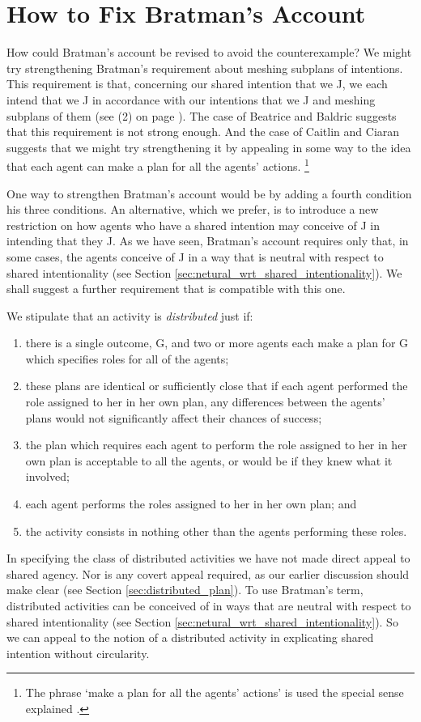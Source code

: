 \documentclass[12pt,\papersize]{extarticle}
\begin{document}
\section{How to Fix Bratman's Account}
\label{sec:fix}

How could Bratman's account be revised to avoid the counterexample?
We might try strengthening Bratman's requirement about meshing subplans of intentions.
This requirement is that, concerning our shared intention that we J, we each intend that we J in accordance with our intentions that we J and meshing subplans of them (see (2) on page \pageref{quote:bratman_account}).
The case of Beatrice and Baldric suggests that this requirement is not strong enough.
And the case of Caitlin and Ciaran suggests that we might try strengthening it by appealing in some way to the idea that each agent can make a plan for all the agents' actions.%
\footnote{
The phrase `make a plan for all the agents' actions' is used the special sense explained .
}

One way to strengthen Bratman's account would be by adding a fourth condition his three conditions.
An alternative, which we prefer, is to introduce a new restriction on how agents who have a shared intention may conceive of J in intending that they J.
As we have seen, Bratman's account requires only that, in some cases, the agents conceive of J in a way that is neutral with respect to shared intentionality (see Section \vref{sec:netural_wrt_shared_intentionality}).
We shall suggest a further requirement that is compatible with this one.

We stipulate that an activity is \emph{distributed} just if: 
%
\begin{enumerate}[label=\emph{\alph*})]
%
\item 	there is a single outcome, G,
	and two or more agents each make a plan for G which specifies  roles for all of the agents;	
%
\item 	these plans are identical or sufficiently close that if each agent performed the role assigned to her in her own plan, any differences between the agents' plans would not significantly affect their chances of success;
%
\item the plan which requires each agent to perform the role assigned to her in her own plan is acceptable to all the agents, or would be if they knew what it involved; 
\item	each agent performs the roles assigned to her in her own plan; and
%
\item	the activity consists in nothing other than the agents performing these roles.
%
\end{enumerate}
%
In specifying the class of distributed activities we have not made direct appeal to shared agency. 
Nor is any covert appeal required, as our earlier discussion should  make clear (see Section \vref{sec:distributed_plan}).
To use Bratman's term, distributed activities can be conceived of in ways that are neutral with respect to shared intentionality (see Section \vref{sec:netural_wrt_shared_intentionality}).
So we can appeal  to the notion of a distributed activity in explicating shared intention without circularity.
\end{document}
